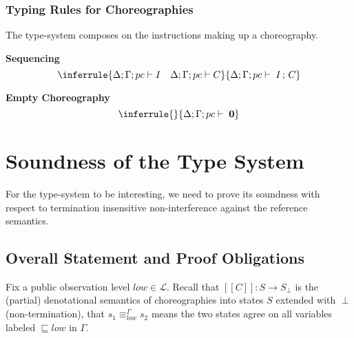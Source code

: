 \documentclass[12pt,a4paper,twoside]{book}
\newcommand{\llbracket}{[\![}
\newcommand{\rrbracket}{]\!]}
\newcommand{\MCL}{\mathscr{L}}
\begin{document}
\subsection{Typing Rules for Choreographies}
The type-system composes on the instructions making up a choreography.

\medskip
\noindent\textbf{Sequencing}
\[
  \inferrule
  { \Delta;\Gamma;pc \vdash I \quad \Delta;\Gamma;pc \vdash C }
  { \Delta;\Gamma;pc \vdash \; I \,;\, C }
\]

\medskip
\noindent\textbf{Empty Choreography}
\[
  \inferrule
  {}{\Delta;\Gamma;pc \vdash \; \boldsymbol{0}}
\]

\chapter{Soundness of the Type System}
\label{chap:soundness-proof}
For the type-system to be interesting, we need to prove its soundness with respect to termination insensitive non-interference against the reference semantics.

\section{Overall Statement and Proof Obligations}

Fix a public observation level \(low \in \MCL\).
Recall that \( \llbracket C \rrbracket : S \to S_\perp \) is the (partial) denotational semantics of choreographies into states \(S\) extended with \(\perp\) (non-termination), that \(s_1 \equiv^\Gamma_{low} s_2\) means the two states agree on all variables labeled \(\sqsubseteq low\) in $\Gamma$.
\end{document}
